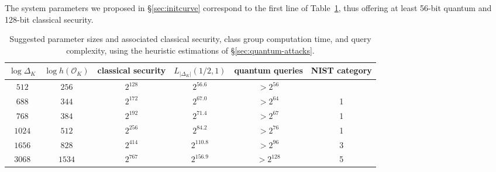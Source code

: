 \documentclass{llncs}
\renewcommand{\O}{\mathcal{O}}
\begin{document}
The system parameters we proposed in \S\ref{sec:initcurve}
correspond to the first line of Table~\ref{tab:sizes}, 
thus offering at least 56-bit quantum 
and 128-bit classical security.


\begin{table}
    \renewcommand{\arraystretch}{1.4}
    \centering
    \begin{tabular}{c@{\;}|@{\;}c@{\;}|@{\;}c@{\;}|@{\;}c@{\;}|@{\;}c@{\;}|@{\;}c}
        $\log Δ_K$ & $\log h(\O_K)$
        & \parbox{10ex}{\centering classical security}
        & $L_{|Δ_K|}(1/2,1)$ 
        & \parbox{10ex}{\centering quantum queries}
        & \parbox{10ex}{\centering NIST category} \\
        \hline
        $512$  &  $256$ & $2^{128}$ &  $2^{56.6}$ & $> 2^{56}$ \\
        $688$  &  $344$ & $2^{172}$ &  $2^{67.0}$ & $> 2^{64}$ & 1\\
        $768$  &  $384$ & $2^{192}$ &  $2^{71.4}$ & $> 2^{67}$ & 1\\
        $1024$ &  $512$ & $2^{256}$ &  $2^{84.2}$ & $> 2^{76}$ & 1\\
        $1656$ &  $828$ & $2^{414}$ & $2^{110.8}$ & $> 2^{96}$ & 3\\
        $3068$ & $1534$ & $2^{767}$ & $2^{156.9}$ & $> 2^{128}$ & 5
        \\
        \hline
    \end{tabular}
    \smallskip
    \caption{Suggested parameter sizes and associated classical
      security, class group computation time, and query complexity,
      using the heuristic estimations of
      \S\ref{sec:quantum-attacks}.}
    \label{tab:sizes}
\end{table}
\end{document}
